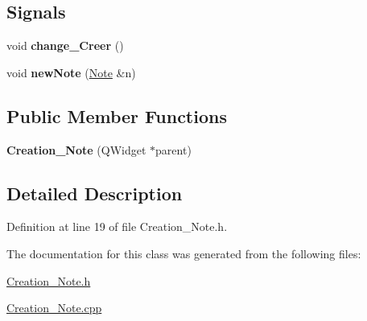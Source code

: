\subsection*{Signals}
\begin{DoxyCompactItemize}
\item 
\mbox{\label{class_creation___note_ac077793d8161d266c9d500c6545da80e}} 
void {\bfseries change\+\_\+\+Creer} ()
\item 
\mbox{\label{class_creation___note_a51d4541fbf18ccb297ce5f15da3a6cab}} 
void {\bfseries new\+Note} (\hyperlink{class_note}{Note} \&n)
\end{DoxyCompactItemize}
\subsection*{Public Member Functions}
\begin{DoxyCompactItemize}
\item 
\mbox{\label{class_creation___note_a76278cf9f0de87cd61f204aafcebd5d2}} 
{\bfseries Creation\+\_\+\+Note} (Q\+Widget $\ast$parent)
\end{DoxyCompactItemize}


\subsection{Detailed Description}


Definition at line 19 of file Creation\+\_\+\+Note.\+h.



The documentation for this class was generated from the following files\+:\begin{DoxyCompactItemize}
\item 
\hyperlink{_creation___note_8h}{Creation\+\_\+\+Note.\+h}\item 
\hyperlink{_creation___note_8cpp}{Creation\+\_\+\+Note.\+cpp}\end{DoxyCompactItemize}

